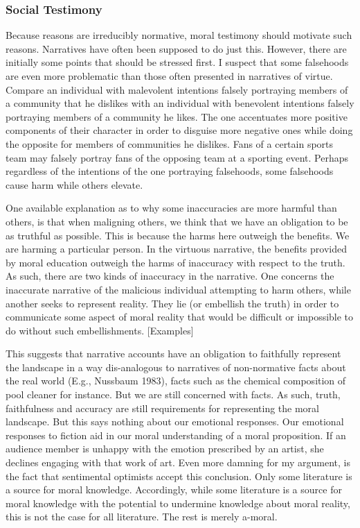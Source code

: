 \documentclass[
  letterpaper,
  DIV=11,
  numbers=noendperiod]{scrartcl}
\theoremstyle{remark}
\begin{document}
\subsubsection{Social Testimony}\label{social-testimony}

Because reasons are irreducibly normative, moral testimony should
motivate such reasons. Narratives have often been supposed to do just
this. However, there are initially some points that should be stressed
first. I suspect that some falsehoods are even more problematic than
those often presented in narratives of virtue. Compare an individual
with malevolent intentions falsely portraying members of a community
that he dislikes with an individual with benevolent intentions falsely
portraying members of a community he likes. The one accentuates more
positive components of their character in order to disguise more
negative ones while doing the opposite for members of communities he
dislikes. Fans of a certain sports team may falsely portray fans of the
opposing team at a sporting event. Perhaps regardless of the intentions
of the one portraying falsehoods, some falsehoods cause harm while
others elevate.

One available explanation as to why some inaccuracies are more harmful
than others, is that when maligning others, we think that we have an
obligation to be as truthful as possible. This is because the harms here
outweigh the benefits. We are harming a particular person. In the
virtuous narrative, the benefits provided by moral education outweigh
the harms of inaccuracy with respect to the truth. As such, there are
two kinds of inaccuracy in the narrative. One concerns the inaccurate
narrative of the malicious individual attempting to harm others, while
another seeks to represent reality. They lie (or embellish the truth) in
order to communicate some aspect of moral reality that would be
difficult or impossible to do without such embellishments.
{[}Examples{]}

This suggests that narrative accounts have an obligation to faithfully
represent the landscape in a way dis-analogous to narratives of
non-normative facts about the real world (E.g., Nussbaum 1983), facts
such as the chemical composition of pool cleaner for instance. But we
are still concerned with facts. As such, truth, faithfulness and
accuracy are still requirements for representing the moral landscape.
But this says nothing about our emotional responses. Our emotional
responses to fiction aid in our moral understanding of a moral
proposition. If an audience member is unhappy with the emotion
prescribed by an artist, she declines engaging with that work of art.
Even more damning for my argument, is the fact that sentimental
optimists accept this conclusion. Only some literature is a source for
moral knowledge. Accordingly, while some literature is a source for
moral knowledge with the potential to undermine knowledge about moral
reality, this is not the case for all literature. The rest is merely
a-moral.
\end{document}
